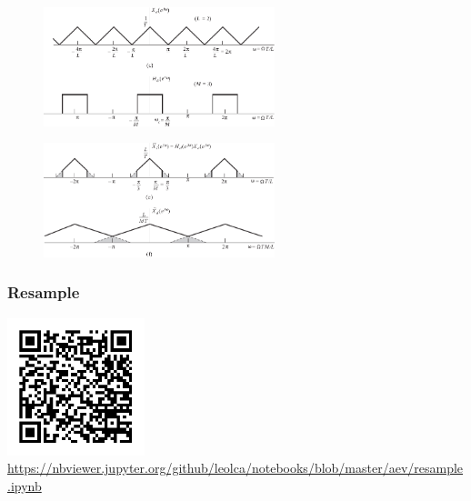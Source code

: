 \begin{frame}[allowframebreaks]
\begin{example}
  \examplebreak

        \begin{figure}[h!]
        \centering
        \includegraphics[width=0.6\textwidth]{images/fig430cd.pdf}
        \label{fig:fig430cd}
        \end{figure}

  \examplebreak

        \begin{figure}[h!]
        \centering
        \includegraphics[width=0.6\textwidth]{images/fig430ef.pdf}
        \label{fig:fig430ef}
        \end{figure}

  \end{example}
\end{frame}

\begin{frame}%
  \frametitle{Resample}

  \centering
  \includegraphics[width=0.3\textwidth]{images/qrcode-jupyter-resampling.pdf}
  \url{https://nbviewer.jupyter.org/github/leolca/notebooks/blob/master/aev/resample.ipynb}

\end{frame}



